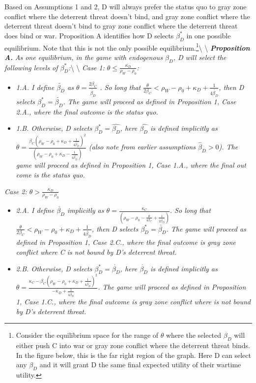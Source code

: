 \documentclass[
]{article}
\begin{document}
Based on Assumptions 1 and 2, D will always prefer the status quo to
gray zone conflict where the deterrent threat doesn't bind, and gray
zone conflict where the deterrent threat doesn't bind to gray zone
conflict where the deterrent threat does bind or war. Proposition A
identifies how D selects \(\beta_{D}^{*}\) in one possible equilibrium.
Note that this is not the only possible
equilibrium.\footnote{Consider the equilibrium space for the range of $\theta$ where the selected $\beta_{D}$ will either push C into war or gray zone conflict where the deterrent threat binds. In the figure below, this is the far right region of the graph. Here D can select any $\beta_{D}$ and it will grant D the same final expected utility of their wartime utility.}\textbackslash{}
\textbackslash{}
\textbf{\textit{Proposition A.}}\textit{ As one equilibrium, in the game with endogenous $\beta_{D}$, D will select the following levels of $\beta_{D}^{*}$:}\textbackslash{}
\textbackslash{}
\textit{Case 1: $\theta\leq\frac{\kappa_{D}}{\rho_{W}-\rho_{0}}$:}

\begin{itemize}
\item \textit{1.A. I define $\tilde{\beta_{D}}$ as $\theta=\frac{2\beta_{C}}{\tilde{\beta_{D}}}$ . So long that $\frac{\theta}{2\beta_{C}}<\rho_{W}-\rho_{0}+\kappa_{D}+\frac{1}{4\tilde{\beta_{D}}}$, then D selects $\beta_{D}^{*}=\tilde{\beta_{D}}$. The game will proceed as defined in Proposition 1, Case 2.A., where the final outcome is the status quo.} 
\item \textit{1.B. Otherwise, D selects $\beta_{D}^{*}=\hat{\beta_{D}}$, here $\hat{\beta_{D}}$ is defined implicitly as $\theta=\frac{\beta_{C}\left(\rho_{W}-\rho_{0}+\kappa_{D}+\frac{1}{4\hat{\beta_{D}}}\right)^{2}}{\left(\rho_{W}-\rho_{0}+\kappa_{D}-\frac{1}{4\hat{\beta_{D}}}\right)}$ (also note from earlier assumptions $\hat{\beta}_{D}>0$). The game will proceed as defined in Proposition 1, Case 1.A., where the final out come is the status quo.} 
\end{itemize}

\textit{Case 2: $\theta>\frac{\kappa_{D}}{\rho_{W}-\rho_{0}}$}

\begin{itemize}
\item \textit{2.A. I define $\check{\beta_{D}}$ implicitly as $\theta=\frac{\kappa_{C}}{\left(\rho_{W}-\rho_{0}-\frac{\theta}{4\beta_{C}}+\frac{1}{2\check{\beta_{D}}}\right)}$. So long that $\frac{\theta}{2\beta_{C}}<\rho_{W}-\rho_{0}+\kappa_{D}+\frac{1}{4\check{\beta_{D}}}$, then D selects $\beta_{D}^{*}=\check{\beta_{D}}$. The game will proceed as defined in Proposition 1, Case 2.C., where the final outcome is gray zone conflict where C is not bound by D's deterrent threat.} 
\item \textit{2.B. Otherwise, D selects $\beta_{D}^{*}=\dot{\beta_{D}}$, here $\dot{\beta_{D}}$ is defined implicitly as $\theta=\frac{\kappa_{C}-\beta_{C}\left(\rho_{W}-\rho_{0}+\kappa_{D}+\frac{1}{4\dot{\beta_{D}}}\right)^{2}}{-\kappa_{D}+\frac{1}{4\dot{\beta_{D}}}}$. The game will proceed as defined in Proposition 1, Case 1.C., where the final outcome is gray zone conflict where is not bound by D's deterrent threat.} 
\end{itemize}
\end{document}
